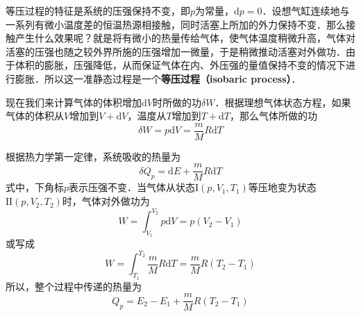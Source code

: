 

等压过程的特征是系统的压强保持不变，即$p $为常量，$\mathrm dp =0$．设想气缸连续地与一系列有微小温度差的恒温热源相接触，同时活塞上所加的外力保持不变．那么接触产生什么效果呢？就是将有微小的热量传给气体，使气体温度稍微升高，气体对活塞的压强也随之较外界所施的压强增加一微量，于是稍微推动活塞对外做功．由于体积的膨胀，压强降低，从而保证气体在内、外压强的量值保持不变的情况下进行膨胀．所以这一准静态过程是一个\textbf{等压过程（isobaric process）}．

现在我们来计算气体的体积增加$\mathrm d V $时所做的功$\delta W$．根据理想气体状态方程，如果气体的体积从$V $增加到$V+\mathrm dV$，温度从$T $增加到$T+\mathrm dT$，那么气体所做的功
\begin{equation}
\delta W=p \mathrm{d} V=\frac{m}{M} R \mathrm{d} T
\end{equation}

根据热力学第一定律，系统吸收的热量为
\begin{equation}
\delta Q_{p}=\mathrm{d} E+\frac{m}{M} R \mathrm{d} T
\end{equation}
式中，下角标$p $表示压强不变．当气体从状态$\mathrm I(p, V_1, T_1)$等压地变为状态$\mathrm{II}(p, V_2,T_2)$时，气体对外做功为
\begin{equation}
W=\int_{V_{1}}^{V_{2}} p \mathrm{d} V=p\left(V_{2}-V_{1}\right)
\end{equation}
或写成
\begin{equation}
W=\int_{T_{1}}^{T_{2}} \frac{m}{M} R \mathrm{d} T=\frac{m}{M} R\left(T_{2}-T_{1}\right)
\end{equation}
所以，整个过程中传递的热量为
\begin{equation}
Q_{p}=E_{2}-E_{1}+\frac{m}{M} R\left(T_{2}-T_{1}\right)
\end{equation}

